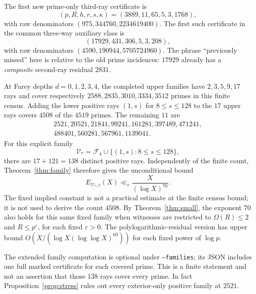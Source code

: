 \documentclass[11pt]{article}
\theoremstyle{remark}\newtheorem{remark}[theorem]{Remark}
\newcommand{\Om}{\Omega}
\begin{document}
The first new prime-only third-ray certificate is
\[
 (p,R,h,r,s,\kappa)=(3889,11,65,5,3,1768),
\]
with raw denominators $(975,344760,2234619400)$. The first such certificate in the common three-way auxiliary class is
\[
 (17929,431,306,5,3,208),
\]
with raw denominators $(4590,190944,5705724960)$. The phrase ``previously missed'' here is relative to the old prime incidences: $17929$ already has a \emph{composite} second-ray residual $2831$.

At Farey depths $d=0,1,2,3,4$, the completed upper families have $2,3,5,9,17$ rays and cover respectively $2588,2835,3010,3334,3512$ primes in this finite census. Adding the lower positive rays $(1,s)$ for $8\le s\le128$ to the $17$ upper rays covers $4508$ of the $4519$ primes. The remaining $11$ are
\[
 \begin{gathered}
 2521,20521,21841,99241,161281,397489,471241,\\
 488401,560281,567961,1139041.
 \end{gathered}
\]
For this explicit family
\[
 \mathcal V_* = \mathcal F_4\cup\{(1,s):8\le s\le128\},
\]
there are $17+121=138$ distinct positive rays. Independently of the finite count, Theorem~\ref{thm:family} therefore gives the unconditional bound
\[
 E_{\mathcal V_*,c}(X)\ll_c \frac{X}{(\log X)^{70}}.
\]
The fixed implied constant is not a practical estimate at the finite census bound; it is not used to derive the count $4508$. By Theorem~\ref{thm:small}, the exponent $70$ also holds for this same fixed family when witnesses are restricted to $\Om(R)\le2$ and $R\le p^\varepsilon$, for each fixed $\varepsilon>0$. The polylogarithmic-residual version has upper bound $O(X/(\log X(\log\log X)^{69}))$ for each fixed power of $\log p$.

The extended family computation is optional under \texttt{--families}; its JSON includes one full marked certificate for each covered prime. This is a finite statement and not an assertion that those $138$ rays cover every prime. In fact Proposition~\ref{prop:stress} rules out every exterior-only positive family at $2521$.
\end{document}
